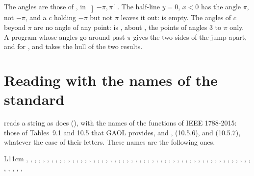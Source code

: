 \noindent
The angles are those of , in $\left]-\pi,\pi\right]$. The
half-line $y=0$, $x<0$ has the angle $\pi$, not $-\pi$, and a $c$ holding
$-\pi$ but not $\pi$ leaves it out: 
is empty. The angles of $c$ beyond $\pi$ are no angle of any point:
 is , about
, the points of angles 3 to $\pi$ only. A program whose
angles go around past $\pi$ gives the two sides of the jump apart,
 and  for , and takes the hull of
the two results.

\section{Reading with the names of the standard}\label{sec:ieee1788-text}
%

 reads a string as 
does (), with the names of the functions of IEEE
1788-2015: those of Tables~9.1 and 10.5 that GAOL provides, and
,  (10.5.6),  and
 (10.5.7), whatever the case of their letters.\newinvfive{}
These names are the following ones.

\begin{center}\small
\begin{tabular}{L{11cm}}
, , , , , ,
, , , , , ,
, , , , , ,
, , , , , ,
, , , , ,
, , , , ,
, , , ,
, , , , ,
, , , ,
, , , , ,
, , , ,
, , ,
\\
\end{tabular}
\end{center}

